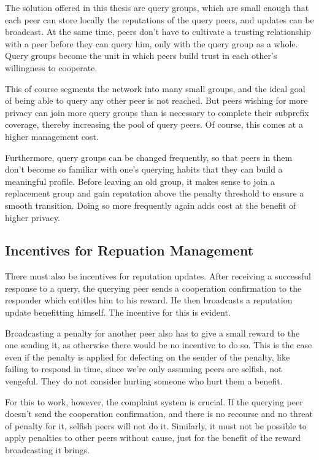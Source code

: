 The solution offered in this thesis are query groups, which are small enough
that each peer can store locally the reputations of the query peers, and updates
can be broadcast. At the same time, peers don't have to cultivate a trusting
relationship with a peer before they can query him, only with the query group as
a whole. Query groups become the unit in which peers build trust in each other's
willingness to cooperate.

This of course segments the network into many small groups, and the ideal goal
of being able to query any other peer is not reached. But peers wishing for more
privacy can join more query groups than is necessary to complete their subprefix
coverage, thereby increasing the pool of query peers. Of course, this comes at a
higher management cost.

Furthermore, query groups can be changed frequently, so that peers in them don't
become so familiar with one's querying habits that they can build a meaningful
profile. Before leaving an old group, it makes sense to join a replacement group
and gain reputation above the penalty threshold to ensure a smooth transition.
Doing so more frequently again adds cost at the benefit of higher privacy.

\subsection{Incentives for Repuation Management}
\label{sec:desc_incentives_rep_mgmt}
There must also be incentives for reputation updates. After receiving a
successful response to a query, the querying peer sends a cooperation
confirmation to the responder which entitles him to his reward. He then
broadcasts a reputation update benefitting himself. The incentive for this is
evident.

Broadcasting a penalty for another peer also has to give a small reward to the
one sending it, as otherwise there would be no incentive to do so. This is the
case even if the penalty is applied for defecting on the sender of the penalty,
like failing to respond in time, since we're only assuming peers are selfish,
not vengeful. They do not consider hurting someone who hurt them a benefit.

For this to work, however, the complaint system is crucial. If the querying peer
doesn't send the cooperation confirmation, and there is no recourse and no
threat of penalty for it, selfish peers will not do it. Similarly, it must not
be possible to apply penalties to other peers without cause, just for the
benefit of the reward broadcasting it brings.

